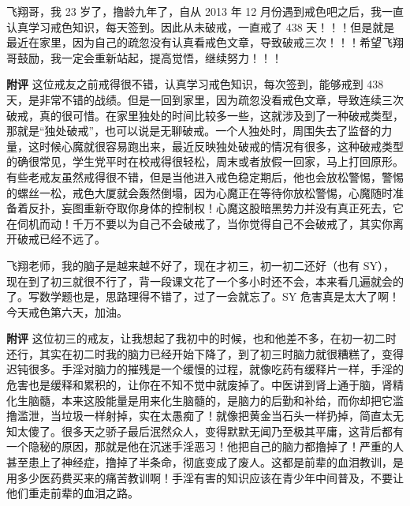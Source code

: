 \begin{case}
    飞翔哥，我 23 岁了，撸龄九年了，自从 2013 年 12 月份遇到戒色吧之后，我一直认真学习戒色知识，每天签到。因此从未破戒，一直戒了 438 天！！！但是就是最近在家里，因为自己的疏忽没有认真看戒色文章，导致破戒三次！！！希望飞翔哥鼓励，我一定会重新站起，提高觉悟，继续努力！！！

    \textbf{附评} 这位戒友之前戒得很不错，认真学习戒色知识，每次签到，能够戒到 438 天，是非常不错的战绩。但是一回到家里，因为疏忽没看戒色文章，导致连续三次破戒，真的很可惜。在家里独处的时间比较多一些，这就涉及到了一种破戒类型，那就是“独处破戒”，也可以说是无聊破戒。一个人独处时，周围失去了监督的力量，这时候心魔就很容易跑出来，最近反映独处破戒的情况有很多，这种破戒类型的确很常见，学生党平时在校戒得很轻松，周末或者放假一回家，马上打回原形。有些老戒友虽然戒得很不错，但是当他进入戒色稳定期后，他也会放松警惕，警惕的螺丝一松，戒色大厦就会轰然倒塌，因为心魔正在等待你放松警惕，心魔随时准备着反扑，妄图重新夺取你身体的控制权！心魔这股暗黑势力并没有真正死去，它在伺机而动！千万不要以为自己不会破戒了，当你觉得自己不会破戒了，其实你离开破戒已经不远了。
\end{case}

\begin{case}
    飞翔老师，我的脑子是越来越不好了，现在才初三，初一初二还好（也有 SY），现在到了初三就很不行了，背一段课文花了一个多小时还不会，本来看几遍就会的了。写数学题也是，思路理得不错了，过了一会就忘了。SY 危害真是太大了啊！今天戒色第六天，加油。

    \textbf{附评} 这位初三的戒友，让我想起了我初中的时候，也和他差不多，在初一初二时还行，其实在初二时我的脑力已经开始下降了，到了初三时脑力就很糟糕了，变得迟钝很多。手淫对脑力的摧残是一个缓慢的过程，就像吃药有缓释片一样，手淫的危害也是缓释和累积的，让你在不知不觉中就废掉了。中医讲到肾上通于脑，肾精化生脑髓，本来这股能量是用来化生脑髓的，是脑力的后勤和补给，而你却把它滥撸滥泄，当垃圾一样射掉，实在太愚痴了！就像把黄金当石头一样扔掉，简直太无知太傻了。很多天之骄子最后泯然众人，变得默默无闻乃至极其平庸，这背后都有一个隐秘的原因，那就是他在沉迷手淫恶习！他把自己的脑力都撸掉了！严重的人甚至患上了神经症，撸掉了半条命，彻底变成了废人。这都是前辈的血泪教训，是用多少医药费买来的痛苦教训啊！手淫有害的知识应该在青少年中间普及，不要让他们重走前辈的血泪之路。
\end{case}

